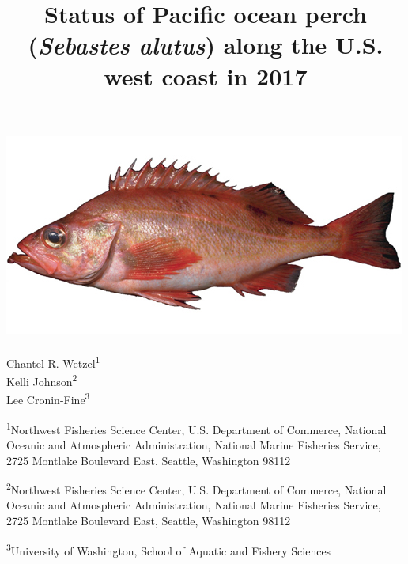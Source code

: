 \documentclass[12pt,]{article}
\title{Status of Pacific ocean perch (\emph{Sebastes alutus}) along the U.S.
west coast in 2017}
\author{}
\date{}
\begin{document}
\maketitle


\begin{center}
\thispagestyle{empty}


\vspace{.5cm}

\includegraphics{Sebastes_alutus}~\\[0.5cm]



Chantel R. Wetzel\textsuperscript{1}\\
Kelli Johnson\textsuperscript{2}\\
Lee Cronin-Fine\textsuperscript{3}\\

\vspace{.5cm}

\small
\textsuperscript{1}Northwest Fisheries Science Center, U.S. Department of Commerce, National Oceanic and Atmospheric Administration, National Marine Fisheries Service, 2725 Montlake Boulevard East, Seattle, Washington 98112\\

\vspace{.3cm}

\textsuperscript{2}Northwest Fisheries Science Center, U.S. Department of Commerce, National Oceanic and Atmospheric Administration, National Marine Fisheries Service, 2725 Montlake Boulevard East, Seattle, Washington 98112\\

\vspace{.3cm}

\textsuperscript{3}University of Washington, School of Aquatic and Fishery Sciences\\


\end{center}
\end{document}
